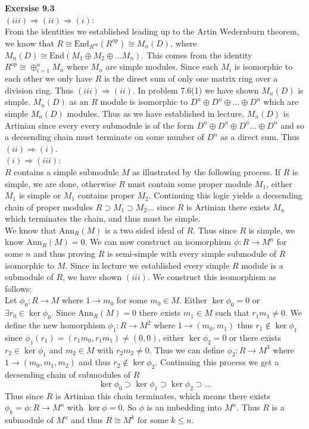 \documentclass[12pt]{article}
\newenvironment{ques}[1]{\textbf{Exersise #1}\vspace{1 mm}\\ }{\bigskip}
\theoremstyle{definition}
\newcommand{\End}{\text{End}}
\begin{document}
\begin{ques}{9.3}
	$(iii) \Rightarrow (ii) \Rightarrow (i)$:\\
	From the identities we established leading up to the Artin Wedernburn
	theorem, we know that $R \cong \End_{R^{op}}(R^{op}) \cong M_{n}(D)$, where
	$M_n(D) \cong \End(M_1 \oplus M_2 \oplus \dots M_n)$. This comes from the
	identity $R^{op} \cong \oplus_{i=1}^n M_n$ where $M_n$ are simple modules.
	Since each $M_i$ is isomorphic to each other we only have $R$ is the direct
	sum of only one matrix ring over a division ring. Thus $(iii) \Rightarrow
	(ii)$. In problem 7.6(1) we have shown $M_n(D)$ is simple. $M_n(D)$ as an
	$R$ module is isomorphic to $D^n \oplus D^n \oplus \dots \oplus D^n$ which
	are simple $M_n(D)$ modules. Thus as we have established in lecture,
	$M_n(D)$ is Artinian since every every submodule is of the form $D^n \oplus
	D^n \oplus D^n \dots \oplus D^n$ and so a decsending chain must terminate
	on some number of $D^n$ as a direct sum.
	Thus $(ii) \Rightarrow (i)$.\\
	$(i) \Rightarrow (iii)$:\\
	$R$ contains a simple submodule $M$ as illustrated by the following
	process. If $R$ is simple, we are done, otherwise $R$ must contain some
	proper module $M_1$, either $M_1$ is simple or $M_1$ contains proper $M_2$.
	Continuing this logic yields a decsending chain of proper modules $R
	\supset M_1 \supset M_2 \dots$ since $R$ is Artinian there exists
	$M_n$ which terminates the chain, and thus must be simple.\\
	We know that Ann$_R(M)$ is a two sided ideal of $R$. Thus since $R$ is
	simple, we know Ann$_R(M) = 0$. We can now construct an isomorphism $\phi:R
	\to M^n$ for some $n$ and thus proving $R$ is semi-simple with every simple
	submodule of $R$ isomorphic to $M$. Since in lecture we established every
	simple $R$ module is a submodule of $R$, we have shown $(iii)$. We
	construct this isomorphism as follows:\\
	Let $\phi_0:R \to M$ where $1 \to m_0$ for some $m_0 \in M$. Either $\ker
	\phi_0 = 0$ or $\exists r_0 \in \ker \phi_0$. Since Ann$_R(M)= 0$ there
	exists $m_1 \in M$ such that $r_1m_1 \neq 0$. We define the new homorphism
	$\phi_1:R \to M^2$ where $1 \to (m_0, m_1)$ thus $r_1 \notin \ker \phi_1$
	since $\phi_1(r_1) = (r_1m_0,r_1m_1) \neq (0,0)$, either $\ker \phi_2 = 0$ or
	there exists $r_2 \in \ker \phi_1$ and $m_2 \in M$ with $r_2m_2 \neq 0$.
	Thus we can define $\phi_2 : R \to M^3$ where $1 \to (m_0,m_1,m_2)$ and
	thus $r_2 \notin \ker \phi_2$. Continuing this process we get a decsending
	chain of submodules of $R$
	$$\ker \phi_0 \supset \ker \phi_1 \supset \ker \phi_2 \supset \dots $$
	Thus since $R$ is Artinian this chain terminates, which means there exists
	$\phi_k = \phi:R \to M^n$ with $\ker \phi = 0$. So $\phi$ is an imbedding
	into $M^n$. Thus $R$ is a submodule of $M^n$ and thus $R \cong M^k$ for
	some $k \leq n$.


\end{ques}
\end{document}
